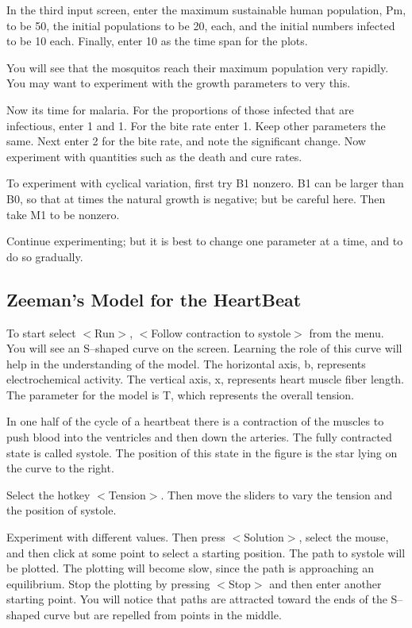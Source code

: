    In the third input screen, enter the maximum sustainable human
population, Pm, to be 50, the initial populations to be 20, each,
and the initial numbers infected to be 10 each. Finally, enter 10 as
the time span for the plots.

   You will see that the mosquitos reach their maximum population
very rapidly. You may want to experiment with the growth parameters to
very this.

   Now its time for malaria. For the proportions of those infected
that are infectious, enter 1 and 1. For the bite rate enter 1. Keep
other parameters the same. Next enter 2 for the bite rate, and note
the significant change. Now experiment with quantities such as the
death and cure rates.

   To experiment with cyclical variation, first try B1 nonzero. B1
can be larger than B0, so that at times the natural growth is negative;
but be careful here. Then take M1 to be nonzero.

   Continue experimenting; but it is best to change one parameter at a
time, and to do so gradually.


\subsection{Zeeman's Model for the HeartBeat}

   To start select $<$Run$>$, $<$Follow contraction to systole$>$ from the
menu. You will see an S--shaped curve on the screen. Learning the role
of this curve will help in the understanding of the model. The
horizontal axis, b, represents electrochemical activity. The vertical
axis, x, represents heart muscle fiber length. The parameter for the
model is T, which represents the overall tension.

   In one half of the cycle of a heartbeat there is a contraction of
the muscles to push blood into the ventricles and then down the
arteries. The fully contracted state is called systole. The position
of this state in the figure is the star lying on the curve to the right.

   Select the hotkey $<$Tension$>$. Then move the sliders to vary the tension
and the position of systole.

   Experiment with different values. Then press $<$Solution$>$, select
the mouse, and then click at some point to select a starting position.
The path to systole will be plotted. The plotting will become slow,
since the path is approaching an equilibrium. Stop the plotting by
pressing $<$Stop$>$ and then enter another starting point. You will notice
that paths are attracted toward the ends of the S--shaped curve but
are repelled from points in the middle.

